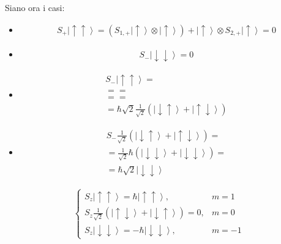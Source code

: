 Siano ora i casi:
\begin{itemize}
\item 
\begin{equation}\begin{split}
S_+\left |\uparrow \uparrow \right\rangle=\left(S_{1,+}\left |\uparrow \right\rangle\otimes \left |\uparrow \right\rangle\right)+\left |\uparrow \right\rangle\otimes S_{2,+}\left |\uparrow \right\rangle=0
\end{split}\end{equation}
\item 
\begin{equation}\begin{split}
S_-\left |\downarrow \downarrow \right\rangle=0
\end{split}\end{equation}
\item 
\begin{equation}\begin{split}
S_-\left |\uparrow \uparrow \right\rangle=\\
= =\\
= =\\
=\hbar \sqrt{2}\frac{1}{\sqrt{2}}\left(\left |\downarrow \uparrow \right\rangle +\left |\uparrow \downarrow \right\rangle\right)
\end{split}\end{equation}
\item 
\begin{equation}\begin{split}
S_-\frac{1}{\sqrt{2}}\left(\left |\downarrow \uparrow \right\rangle +\left |\uparrow \downarrow \right\rangle\right)=\\
=\frac{1}{\sqrt{2}}\hbar \left(\left |\downarrow \downarrow \right\rangle+\left |\downarrow \downarrow \right\rangle\right)=\\
=\hbar \sqrt{2}\left |\downarrow \downarrow \right\rangle
\end{split}\end{equation}
\end{itemize}

\begin{equation}\begin{split}
\begin{cases}
S_z\left |\uparrow \uparrow \right\rangle=\hbar \left |\uparrow \uparrow \right\rangle, & m=1 \\
S_z\frac{1}{\sqrt{2}}\left(\left |\uparrow \downarrow \right\rangle+\left |\downarrow \uparrow \right\rangle\right)=0, & m=0 \\
S_z\left |\downarrow \downarrow \right\rangle=-\hbar \left |\downarrow \downarrow \right\rangle, & m=-1
\end{cases}
\end{split}\end{equation}

